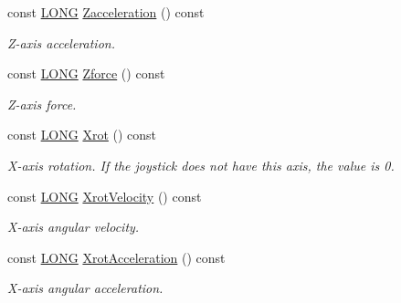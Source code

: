 \begin{DoxyCompactItemize}
const \hyperlink{_joypad_8h_a2a3e0cda5f1249bef6db47c5eb8e3813}{L\+O\+NG} \hyperlink{class_c_joypad_aa4853aed25405766be055bdb0c7c06a1}{Zacceleration} () const
\begin{DoxyCompactList}\small\item\em Z-\/axis acceleration. \end{DoxyCompactList}\item 
\mbox{\label{class_c_joypad_a1a1cbce0bc5fe196ae00796ab9355d82}} 
const \hyperlink{_joypad_8h_a2a3e0cda5f1249bef6db47c5eb8e3813}{L\+O\+NG} \hyperlink{class_c_joypad_a1a1cbce0bc5fe196ae00796ab9355d82}{Zforce} () const
\begin{DoxyCompactList}\small\item\em Z-\/axis force. \end{DoxyCompactList}\item 
\mbox{\label{class_c_joypad_aff00728a2ebbf208309c3a7849f57596}} 
const \hyperlink{_joypad_8h_a2a3e0cda5f1249bef6db47c5eb8e3813}{L\+O\+NG} \hyperlink{class_c_joypad_aff00728a2ebbf208309c3a7849f57596}{Xrot} () const
\begin{DoxyCompactList}\small\item\em X-\/axis rotation. If the joystick does not have this axis, the value is 0. \end{DoxyCompactList}\item 
\mbox{\label{class_c_joypad_a76360d49ea28d6232e76b577aca8c72e}} 
const \hyperlink{_joypad_8h_a2a3e0cda5f1249bef6db47c5eb8e3813}{L\+O\+NG} \hyperlink{class_c_joypad_a76360d49ea28d6232e76b577aca8c72e}{Xrot\+Velocity} () const
\begin{DoxyCompactList}\small\item\em X-\/axis angular velocity. \end{DoxyCompactList}\item 
\mbox{\label{class_c_joypad_ae90fe74150e87c21916058dafb9c289c}} 
const \hyperlink{_joypad_8h_a2a3e0cda5f1249bef6db47c5eb8e3813}{L\+O\+NG} \hyperlink{class_c_joypad_ae90fe74150e87c21916058dafb9c289c}{Xrot\+Acceleration} () const
\begin{DoxyCompactList}\small\item\em X-\/axis angular acceleration. \end{DoxyCompactList}\item 
\mbox{\label{class_c_joypad_a1698ee36211a10513530a5bf13558eb9}} 

\end{DoxyCompactItemize}
